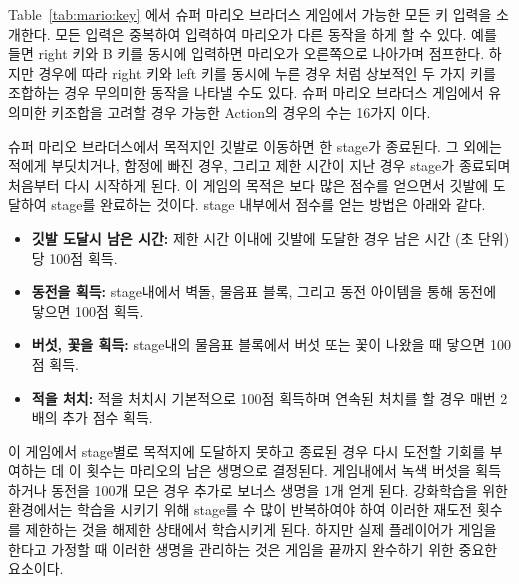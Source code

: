 Table~\ref{tab:mario:key} 에서 슈퍼 마리오 브라더스 게임에서 가능한 모든 키 입력을 소개한다.
모든 입력은 중복하여 입력하여 마리오가 다른 동작을 하게 할 수 있다.
예를 들면 right 키와 B 키를 동시에 입력하면 마리오가 오른쪽으로 나아가며 점프한다.
하지만 경우에 따라 right 키와 left 키를 동시에 누른 경우 처럼 상보적인 두 가지 키를 조합하는 경우 무의미한 동작을 나타낼 수도 있다.
슈퍼 마리오 브라더스 게임에서 유의미한 키조합을 고려할 경우 가능한 Action의 경우의 수는 16가지 이다.

슈퍼 마리오 브라더스에서 목적지인 깃발로 이동하면 한 stage가 종료된다.
그 외에는 적에게 부딧치거나, 함정에 빠진 경우, 그리고 제한 시간이 지난 경우 stage가 종료되며 처음부터 다시 시작하게 된다.
이 게임의 목적은 보다 많은 점수를 얻으면서 깃발에 도달하여 stage를 완료하는 것이다.
stage 내부에서 점수를 얻는 방법은 아래와 같다.
\begin{itemize}
	\item \textbf{깃발 도달시 남은 시간:}
		제한 시간 이내에 깃발에 도달한 경우 남은 시간 (초 단위)당 100점 획득.
	\item \textbf{동전을 획득:}
		stage내에서 벽돌, 물음표 블록, 그리고 동전 아이템을 통해 동전에 닿으면 100점 획득.
	\item \textbf{버섯, 꽃을 획득:}
		stage내의 물음표 블록에서 버섯 또는 꽃이 나왔을 때 닿으면 100점 획득.
	\item \textbf{적을 처치:}
		적을 처치시 기본적으로 100점 획득하며 연속된 처치를 할 경우 매번 2배의 추가 점수 획득.
\end{itemize}

이 게임에서 stage별로 목적지에 도달하지 못하고 종료된 경우 다시 도전할 기회를 부여하는 데 이 횟수는 마리오의 남은 생명으로 결정된다.
게임내에서 녹색 버섯을 획득하거나 동전을 100개 모은 경우 추가로 보너스 생명을 1개 얻게 된다.
강화학습을 위한 환경에서는 학습을 시키기 위해 stage를 수 많이 반복하여야 하여 이러한 재도전 횟수를 제한하는 것을 해제한 상태에서 학습시키게 된다.
하지만 실제 플레이어가 게임을 한다고 가정할 때 이러한 생명을 관리하는 것은 게임을 끝까지 완수하기 위한 중요한 요소이다.
